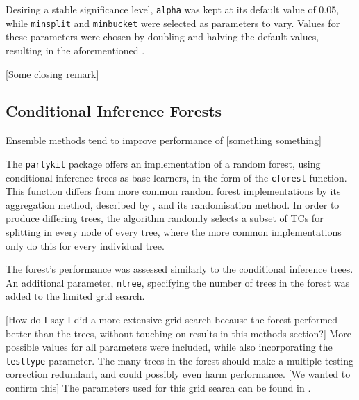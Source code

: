 Desiring a stable significance level, \verb|alpha| was kept at its default value of 0.05, while \verb|minsplit| and \verb|minbucket| were selected as parameters to vary.
Values for these parameters were chosen by doubling and halving the default values, resulting in the aforementioned .



[Some closing remark]

\subsection{Conditional Inference Forests}
Ensemble methods tend to improve performance of [something something]

The \verb|partykit| package offers an implementation of a random forest, using conditional inference trees as base learners, in the form of the \verb|cforest| function.
This function differs from more common random forest implementations by its aggregation method, described by \cite{cforest:agg}, and its randomisation method.
In order to produce differing trees, the algorithm randomly selects a subset of TCs for splitting in every node of every tree, where the more common implementations only do this for every individual tree.

The forest's performance was assessed similarly to the conditional inference trees.
An additional parameter, \verb|ntree|, specifying the number of trees in the forest was added to the limited grid search.



[How do I say I did a more extensive grid search because the forest performed better than the trees, without touching on results in this methods section?]
More possible values for all parameters were included, while also incorporating the \verb|testtype| parameter.
The many trees in the forest should make a multiple testing correction redundant, and could possibly even harm performance.
[We wanted to confirm this]
The parameters used for this grid search can be found in .




